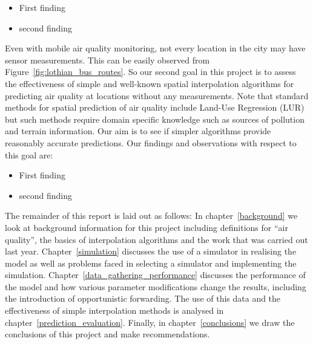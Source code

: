     \begin{itemize}
        \item First finding
        \item second finding
    \end{itemize}


    Even with mobile air quality monitoring, not every location in the city may have sensor measurements. This can be easily observed from Figure~\ref{fig:lothian_bus_routes}. So our second goal in this project is to assess the effectiveness of simple and well-known spatial interpolation algorithms for predicting air quality at locations without any measurements. Note that standard methods for spatial prediction of air quality include Land-Use Regression (LUR) but such methods require domain specific knowledge such as sources of pollution and terrain information. Our aim is to see if simpler algorithms provide reasonably accurate predictions. Our findings and observations with respect to this goal are:

    \begin{itemize}
        \item First finding
        \item second finding
    \end{itemize}

    The remainder of this report is laid out as follows: In chapter~\ref{background} we look at background information for this project including definitions for ``air quality'', the basics of interpolation algorithms and the work that was carried out last year. Chapter~\ref{simulation} discusses the use of a simulator in realising the model as well as problems faced in selecting a simulator and implementing the simulation. Chapter~\ref{data_gathering_performance} discusses the performance of the model and how various parameter modifications change the results, including the introduction of opportunistic forwarding. The use of this data and the effectiveness of simple interpolation methods is analysed in chapter~\ref{prediction_evaluation}. Finally, in chapter~\ref{conclusions} we draw the conclusions of this project and make recommendations.

